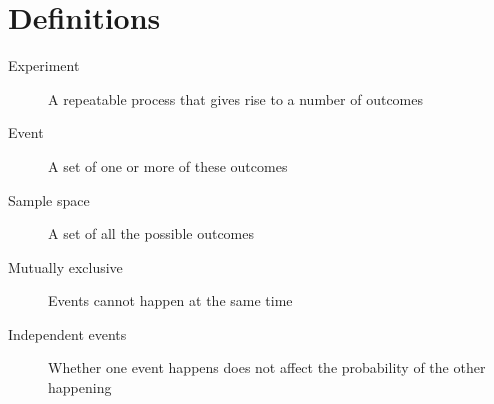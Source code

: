 \section{Definitions}
\begin{description}
    \item[Experiment] A repeatable process that gives rise to a number of outcomes
    \item[Event] A set of one or more of these outcomes
    \item[Sample space] A set of all the possible outcomes
    \item[Mutually exclusive] Events cannot happen at the same time
    \item[Independent events] Whether one event happens does not affect the probability of the other happening
\end{description}

